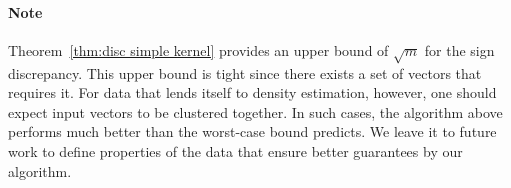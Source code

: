 \documentclass[anon,12pt]{colt2019} %
\newcommand{\E}{\mathbb{E}}
\renewcommand{\Pr}{\operatorname{Pr}}
\begin{document}
\paragraph{Note} Theorem~\ref{thm:disc simple kernel} provides an upper bound of $\sqrt{m}$ for the sign discrepancy. 
This upper bound is tight since there exists a set of vectors that requires it. 
For data that lends itself to density estimation, however, one should expect input vectors to be clustered together.
In such cases, the algorithm above performs much better than the worst-case bound predicts. We leave it to future work to define properties of the data that ensure better guarantees by our algorithm.



\appendix

%
%
\end{document}
